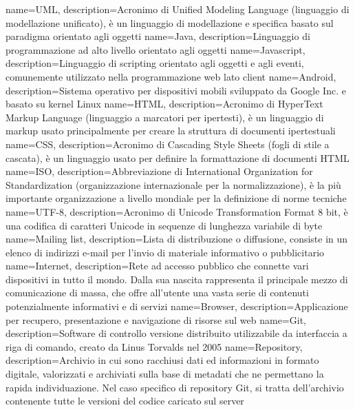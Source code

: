 {
	name=UML,
	description={Acronimo di Unified Modeling Language (linguaggio di modellazione
	unificato), è un linguaggio di modellazione e specifica basato sul paradigma
	orientato agli oggetti}
}
 {
	name=Java,
	description={Linguaggio di programmazione ad alto livello orientato agli oggetti}
}
 {
	name=Javascript,
	description={Linguaggio di scripting orientato agli oggetti e agli eventi, 
	comunemente utilizzato nella programmazione web lato client}
}
 {
	name=Android,
	description={Sistema operativo per dispositivi mobili sviluppato da Google Inc. e basato su
	kernel Linux}
}
 {
	name=HTML,
	description={Acronimo di HyperText Markup Language (linguaggio a marcatori per
	ipertesti), è un linguaggio di markup usato principalmente per creare la
	struttura di documenti ipertestuali}
}
 {
	name=CSS,
	description={Acronimo di Cascading Style Sheets (fogli di stile a cascata), è un linguaggio
	usato per definire la formattazione di documenti HTML}
}
 {
	name=ISO,
	description={Abbreviazione di International Organization for Standardization (organizzazione
	internazionale per la normalizzazione), è la più importante organizzazione a livello mondiale
	per la definizione di norme tecniche}
}
 {
	name=UTF-8,
	description={Acronimo di Unicode Transformation Format 8 bit, è una codifica di caratteri
	Unicode in sequenze di lunghezza variabile di byte}
}
 {
	name=Mailing list,
	description={Lista di distribuzione o diffusione, consiste in un elenco di indirizzi e-mail per
	l'invio di materiale informativo o pubblicitario}
}
 {
	name=Internet,
	description={Rete ad accesso pubblico che connette vari dispositivi in tutto il mondo.
	Dalla sua nascita rappresenta il principale mezzo di comunicazione di massa, che offre
	all'utente una vasta serie di contenuti potenzialmente informativi e di servizi}
}
 {
	name=Browser,
	description={Applicazione per recupero, presentazione e navigazione di risorse sul web}
}
 {
	name=Git,
	description={Software di controllo versione distribuito utilizzabile da interfaccia
	a riga di comando, creato da Linus Torvalds nel 2005}
}
 {
	name=Repository,
	description={Archivio in cui sono racchiusi dati ed informazioni in formato digitale,
	valorizzati e archiviati sulla base di metadati che ne permettano la rapida individuazione.
	Nel caso specifico di repository Git, si tratta dell'archivio contenente tutte le versioni
	del codice caricato sul server}
}
